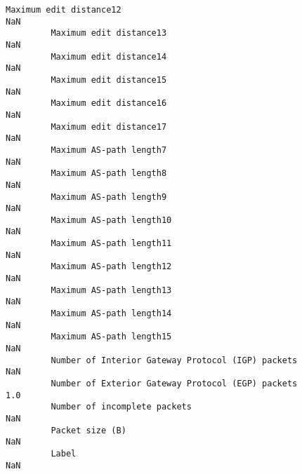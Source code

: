 \documentclass[11pt]{article}
\begin{document}
\begin{Verbatim}[commandchars=\\\{\}]
         Maximum edit distance12                                                                          NaN   
         Maximum edit distance13                                                                          NaN   
         Maximum edit distance14                                                                          NaN   
         Maximum edit distance15                                                                          NaN   
         Maximum edit distance16                                                                          NaN   
         Maximum edit distance17                                                                          NaN   
         Maximum AS-path length7                                                                          NaN   
         Maximum AS-path length8                                                                          NaN   
         Maximum AS-path length9                                                                          NaN   
         Maximum AS-path length10                                                                         NaN   
         Maximum AS-path length11                                                                         NaN   
         Maximum AS-path length12                                                                         NaN   
         Maximum AS-path length13                                                                         NaN   
         Maximum AS-path length14                                                                         NaN   
         Maximum AS-path length15                                                                         NaN   
         Number of Interior Gateway Protocol (IGP) packets                                                NaN   
         Number of Exterior Gateway Protocol (EGP) packets                                                1.0   
         Number of incomplete packets                                                                     NaN   
         Packet size (B)                                                                                  NaN   
         Label                                                                                            NaN   
         

\end{Verbatim}
\end{document}
